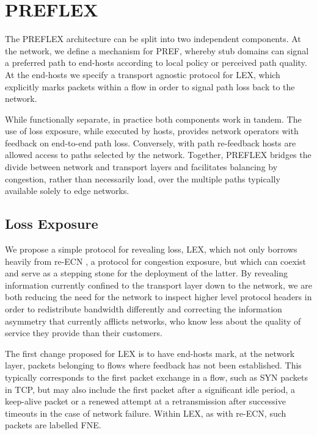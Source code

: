 \section{PREFLEX}

The \ac{PREFLEX} architecture can be split into two independent components. At the network, we define a mechanism for \ac{PREF}, whereby stub domains can signal a preferred path to end-hosts according to local policy or perceived path quality. At the end-hosts we specify a transport agnostic protocol for \ac{LEX}, which explicitly marks packets within a flow in order to signal path loss back to the network.

While functionally separate, in practice both components work in tandem. The use of loss exposure, while executed by hosts, provides network operators with feedback on end-to-end path loss. Conversely, with path re-feedback hosts are allowed access to paths selected by the network. Together, \ac{PREFLEX} bridges the divide between network and transport layers and facilitates balancing by congestion, rather than necessarily load, over the multiple paths typically available solely to edge networks.

\subsection{Loss Exposure}

We propose a simple protocol for revealing loss, \ac{LEX}, which not only borrows heavily from re-\ac{ECN} \cite{Briscoe:2008p494}, a protocol for congestion exposure, but which can coexist and serve as a stepping stone for the deployment of the latter. By revealing information currently confined to the transport layer down to the network, we are both reducing the need for the network to inspect higher level protocol headers in order to redistribute bandwidth differently and correcting the information asymmetry that currently afflicts networks, who know less about the quality of service they provide than their customers.


The first change proposed for \ac{LEX} is to have end-hosts mark, at the network layer, packets belonging to flows where feedback has not been established. 
This typically corresponds to the first packet exchange in a flow, such as SYN packets in \ac{TCP}, but may also include the first packet after a significant idle period, a keep-alive packet or a renewed attempt at a retransmission after successive timeouts in the case of network failure. 
Within \ac{LEX}, as with re-\ac{ECN}, such packets are labelled \ac{FNE}.

